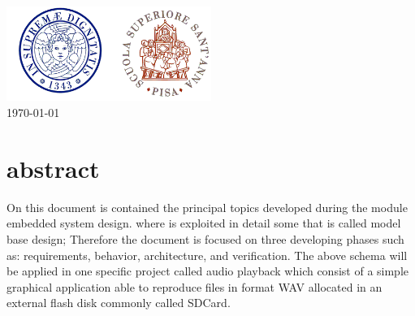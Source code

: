 \begin{titlepage}



\includegraphics[width=0.5\textwidth]{SantanaPisa.png}\\[1cm] %
 



{\large \today}

\vfill %

\end{titlepage}


\section{abstract}
On this document is contained the principal topics developed during the module embedded system design. where is exploited in detail some that is called model base design; Therefore the document is focused on three developing phases such as: requirements, behavior, architecture, and verification.
\newline
\newline
The above schema will be applied in one specific project called audio playback  which consist of a simple graphical application able to reproduce files in format WAV allocated in an external flash disk commonly called SDCard.    


